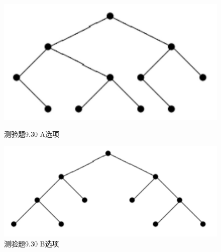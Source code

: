 \documentclass[UTF8, heading=true]{ctexart}
\begin{document}
\begin{figure}[H]
  \centering
  \begin{minipage}[t]{0.25\textwidth}
      \centering
      \includegraphics[width=1\textwidth]{9.30_1.jpg} %
      \vspace{-0.3cm}
      \caption{测验题9.30 A选项}
  \end{minipage}
  \hspace{0.18\textwidth} %
  \begin{minipage}[t]{0.29\textwidth}
      \centering
      \includegraphics[width=1\textwidth]{9.30_2.jpg} %
      \vspace{-0.3cm}
      \caption{测验题9.30 B选项}
\end{minipage}
\end{figure}
\end{document}
